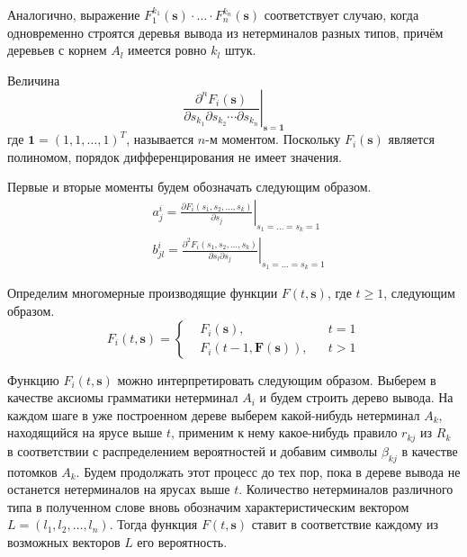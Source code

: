 \documentclass[12pt]{article}
\renewcommand{\geq}{\geqslant}
\begin{document}
Аналогично, выражение $F_1^{k_1}(\mathbf{s}) \cdot \ldots \cdot F_n^{k_n}(\mathbf{s})$ соответствует случаю, когда одновременно строятся деревья вывода из нетерминалов разных типов, причём деревьев с корнем $A_l$ имеется ровно $k_l$ штук.

Величина
\begin{equation*}
	\left.\frac{\partial^n F_i(\mathbf{s})}{\partial s_{k_1} \partial s_{k_2} \cdots \partial s_{k_n}}\right|_{\mathbf{s} = \mathbf{1}}
\end{equation*}
где $\mathbf{1} = (1, 1, \ldots, 1)^T$, называется $n$-м моментом. Поскольку $F_i(\mathbf{s})$ является полиномом, порядок дифференцирования не имеет значения.

Первые и вторые моменты будем обозначать следующим образом.
\begin{equation}
\label{eq:aij-bij-definition}
\begin{split}
	&a^i_j  = \left. \frac{\partial F_i(s_1, s_2, \ldots, s_k)}{\partial s_j} \right|_{s_1 = \ldots = s_k = 1} \\
	&b^i_{jl} = \left. \frac{\partial^2 F_i(s_1, s_2, \ldots, s_k)}{\partial s_l \partial s_j} \right|_{s_1 = \ldots = s_k = 1}
\end{split}
\end{equation}

Определим многомерные производящие функции $F(t, \mathbf{s})$, где $t \geq 1$, следующим образом.
\begin{equation*}
	F_i(t, \mathbf{s}) = \left\{
	\begin{split}
		&F_i(\mathbf{s}), & &t = 1 \\
		&F_i(t-1, \mathbf{F}(\mathbf{s})), & &t > 1
	\end{split}
	\right.
\end{equation*}

Функцию $F_i(t, \mathbf{s})$ можно интерпретировать следующим образом. Выберем в качестве аксиомы грамматики нетерминал $A_i$ и будем строить дерево вывода. На каждом шаге в уже построенном дереве выберем какой-нибудь нетерминал $A_k$, находящийся на ярусе выше $t$, применим к нему какое-нибудь правило $r_{kj}$ из $R_k$ в соответствии с распределением вероятностей и добавим символы $\beta_{kj}$ в качестве потомков $A_k$. Будем продолжать этот процесс до тех пор, пока в дереве вывода не останется нетерминалов на ярусах выше $t$. Количество нетерминалов различного типа в полученном слове вновь обозначим характеристическим вектором $L = (l_1, l_2, \ldots, l_n)$. Тогда функция $F(t, \mathbf{s})$ ставит в соответствие каждому из возможных векторов $L$ его вероятность.
\end{document}
